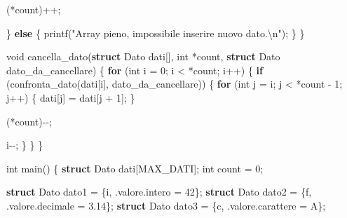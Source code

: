 \documentclass[
  letterpaper,
]{scrbook}
\newenvironment{Shaded}{\begin{snugshade}}{\end{snugshade}}
\newcommand{\CharTok}[1]{\textcolor[rgb]{0.13,0.47,0.30}{#1}}
\newcommand{\ControlFlowTok}[1]{\textcolor[rgb]{0.00,0.23,0.31}{\textbf{#1}}}
\newcommand{\DataTypeTok}[1]{\textcolor[rgb]{0.68,0.00,0.00}{#1}}
\newcommand{\DecValTok}[1]{\textcolor[rgb]{0.68,0.00,0.00}{#1}}
\newcommand{\FloatTok}[1]{\textcolor[rgb]{0.68,0.00,0.00}{#1}}
\newcommand{\KeywordTok}[1]{\textcolor[rgb]{0.00,0.23,0.31}{\textbf{#1}}}
\newcommand{\NormalTok}[1]{\textcolor[rgb]{0.00,0.23,0.31}{#1}}
\newcommand{\OperatorTok}[1]{\textcolor[rgb]{0.37,0.37,0.37}{#1}}
\newcommand{\SpecialCharTok}[1]{\textcolor[rgb]{0.37,0.37,0.37}{#1}}
\newcommand{\StringTok}[1]{\textcolor[rgb]{0.13,0.47,0.30}{#1}}
\newcommand*\circled[1]{\tikz[baseline=(char.base)]{
          \node[shape=circle,draw,inner sep=1pt] (char) {{\scriptsize#1}};}}
\begin{document}
\begin{Shaded}
\begin{Highlighting}[]
    \OperatorTok{(*}\NormalTok{count}\OperatorTok{)++;}

  \OperatorTok{\}} \ControlFlowTok{else} \OperatorTok{\{}
\NormalTok{    printf}\OperatorTok{(}\StringTok{"Array pieno, impossibile inserire nuovo dato.}\SpecialCharTok{\textbackslash{}n}\StringTok{"}\OperatorTok{);}
  \OperatorTok{\}}
\OperatorTok{\}}

\DataTypeTok{void}\NormalTok{ cancella\_dato}\OperatorTok{(}\KeywordTok{struct}\NormalTok{ Dato dati}\OperatorTok{[],} \DataTypeTok{int} \OperatorTok{*}\NormalTok{count}\OperatorTok{,} \KeywordTok{struct}\NormalTok{ Dato dato\_da\_cancellare}\OperatorTok{)} \OperatorTok{\{} \hspace*{\fill}\NormalTok{\circled{5}}
  \ControlFlowTok{for} \OperatorTok{(}\DataTypeTok{int}\NormalTok{ i }\OperatorTok{=} \DecValTok{0}\OperatorTok{;}\NormalTok{ i }\OperatorTok{\textless{}} \OperatorTok{*}\NormalTok{count}\OperatorTok{;}\NormalTok{ i}\OperatorTok{++)} \OperatorTok{\{}
    \ControlFlowTok{if} \OperatorTok{(}\NormalTok{confronta\_dato}\OperatorTok{(}\NormalTok{dati}\OperatorTok{[}\NormalTok{i}\OperatorTok{],}\NormalTok{ dato\_da\_cancellare}\OperatorTok{))} \OperatorTok{\{}
      \ControlFlowTok{for} \OperatorTok{(}\DataTypeTok{int}\NormalTok{ j }\OperatorTok{=}\NormalTok{ i}\OperatorTok{;}\NormalTok{ j }\OperatorTok{\textless{}} \OperatorTok{*}\NormalTok{count }\OperatorTok{{-}} \DecValTok{1}\OperatorTok{;}\NormalTok{ j}\OperatorTok{++)} \OperatorTok{\{}
\NormalTok{        dati}\OperatorTok{[}\NormalTok{j}\OperatorTok{]} \OperatorTok{=}\NormalTok{ dati}\OperatorTok{[}\NormalTok{j }\OperatorTok{+} \DecValTok{1}\OperatorTok{];}
      \OperatorTok{\}}

      \OperatorTok{(*}\NormalTok{count}\OperatorTok{){-}{-};}

\NormalTok{      i}\OperatorTok{{-}{-};} 
    \OperatorTok{\}}
  \OperatorTok{\}}
\OperatorTok{\}}

\DataTypeTok{int}\NormalTok{ main}\OperatorTok{()} \OperatorTok{\{}
  \KeywordTok{struct}\NormalTok{ Dato dati}\OperatorTok{[}\NormalTok{MAX\_DATI}\OperatorTok{];} \hspace*{\fill}\NormalTok{\circled{6}}
  \DataTypeTok{int}\NormalTok{ count }\OperatorTok{=} \DecValTok{0}\OperatorTok{;}

  \KeywordTok{struct}\NormalTok{ Dato dato1 }\OperatorTok{=} \OperatorTok{\{}\CharTok{\textquotesingle{}i\textquotesingle{}}\OperatorTok{,} \OperatorTok{.}\NormalTok{valore}\OperatorTok{.}\NormalTok{intero }\OperatorTok{=} \DecValTok{42}\OperatorTok{\};}
  \KeywordTok{struct}\NormalTok{ Dato dato2 }\OperatorTok{=} \OperatorTok{\{}\CharTok{\textquotesingle{}f\textquotesingle{}}\OperatorTok{,} \OperatorTok{.}\NormalTok{valore}\OperatorTok{.}\NormalTok{decimale }\OperatorTok{=} \FloatTok{3.14}\OperatorTok{\};}
  \KeywordTok{struct}\NormalTok{ Dato dato3 }\OperatorTok{=} \OperatorTok{\{}\CharTok{\textquotesingle{}c\textquotesingle{}}\OperatorTok{,} \OperatorTok{.}\NormalTok{valore}\OperatorTok{.}\NormalTok{carattere }\OperatorTok{=} \CharTok{\textquotesingle{}A\textquotesingle{}}\OperatorTok{\};}
  

\end{Highlighting}
\end{Shaded}
\end{document}
